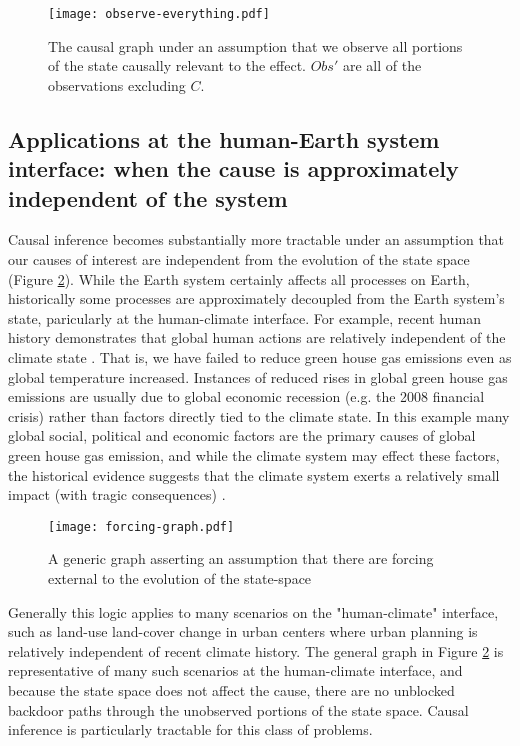 \documentclass[12pt]{article}
\begin{document}
\begin{figure}
  \texttt{[image: observe-everything.pdf]}
  \caption{The causal graph under an assumption that we observe all
    portions of the state causally relevant to the effect. $Obs'$ are
    all of the observations excluding $C$.}
  \label{fig:observed}
\end{figure}

\subsection{Applications at the human-Earth system interface: when the
  cause is approximately independent of the system}
\label{human}

Causal inference becomes substantially more tractable under an
assumption that our causes of interest are independent from the
evolution of the state space (Figure \ref{fig:forcing}). While the
Earth system certainly affects all processes on Earth, historically
some processes are approximately decoupled from the Earth system's
state, paricularly at the human-climate interface. For example, recent
human history demonstrates that global human actions are relatively
independent of the climate state \citep{arto2014drivers}. That is, we
have failed to reduce green house gas emissions even as global
temperature increased. Instances of reduced rises in global green
house gas emissions are usually due to global economic recession
(e.g. the 2008 financial crisis) rather than factors directly tied to
the climate state. In this example many global social, political and
economic factors are the primary causes of global green house gas
emission, and while the climate system may effect these factors, the
historical evidence suggests that the climate system exerts a
relatively small impact (with tragic consequences)
\citep{arto2014drivers}.

\begin{figure}
  \texttt{[image: forcing-graph.pdf]}
  \caption{A generic graph asserting an assumption that there are
    forcing external to the evolution of the state-space}
  \label{fig:forcing}
\end{figure}

Generally this logic applies to many scenarios on the "human-climate"
interface, such as land-use land-cover change in urban centers where
urban planning is relatively independent of recent climate
history. The general graph in Figure \ref{fig:forcing} is
representative of many such scenarios at the human-climate interface,
and because the state space does not affect the cause, there are no
unblocked backdoor paths through the unobserved portions of the state
space. Causal inference is particularly tractable for this class of
problems.
\end{document}
